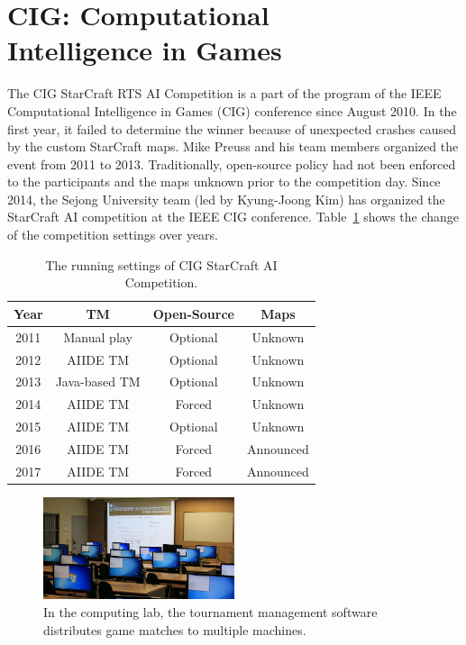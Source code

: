 \section{CIG: Computational\\ Intelligence in Games}\label{subsecCIG}

The CIG StarCraft RTS AI Competition is a part of the program of the IEEE Computational Intelligence in Games (CIG) conference since August 2010. In the first year, it failed to determine the winner because of unexpected crashes caused by the custom StarCraft maps. Mike Preuss and his team members organized the event from 2011 to 2013. Traditionally, open-source policy had not been enforced to the participants and the maps unknown prior to the competition day. Since 2014, the Sejong University team (led by Kyung-Joong Kim) has organized the StarCraft AI competition at the IEEE CIG conference. Table~\ref{tableCIG} shows the change of the competition settings over years.  


\begin{table}[h] 
 \caption{The running settings of CIG StarCraft AI Competition.}
 \label{tableCIG}
 \begin{center}
 \begin{tabular} {| c c c c |}
 \hline
 Year & TM & Open-Source & Maps \\
 \hline
 2011 & Manual play & Optional & Unknown \\
 \hline
 2012 & AIIDE TM & Optional & Unknown \\
 \hline
 2013 & Java-based TM & Optional & Unknown \\
 \hline
 2014 & AIIDE TM & Forced & Unknown \\
 \hline
 2015 & AIIDE TM & Optional & Unknown \\
 \hline
 2016 & AIIDE TM & Forced & Announced \\ 
 \hline
 2017 & AIIDE TM & Forced & Announced \\ 
 \hline   
 \end{tabular}
 \end{center}  
\end{table} 

\begin{figure}[h]
  \centering
  \includegraphics[width=0.5\textwidth]{fig/cig-starcraft-runs.png}
  \caption{In the computing lab, the tournament management software distributes game matches to multiple machines.}
  \label{figCIGruns}
\end{figure}

